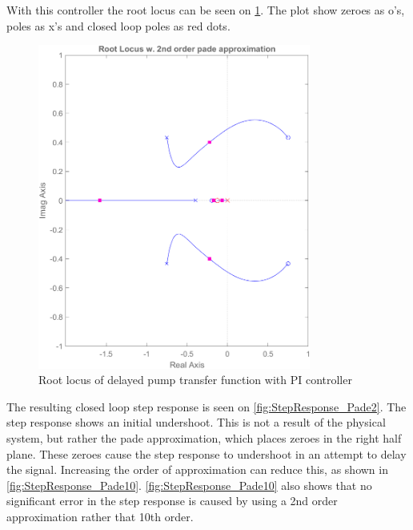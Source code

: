 With this controller the root locus can be seen on \cref{fig:RootLocus_PadeTwo}. The plot show zeroes as o's, poles as x's and closed loop poles as red dots.
\begin{figure}[h!]
	\centering
	\includegraphics[width=0.8\textwidth]{Pictures/RootLocus_Pade2.png}
	
	\caption{Root locus of delayed pump transfer function with PI controller}
	\label{fig:RootLocus_PadeTwo}
\end{figure}

The resulting closed loop step response is seen on \cref{fig:StepResponse_Pade2}. The step response shows an initial undershoot. This is not a result of the physical system, but rather the pade approximation, which places zeroes in the right half plane. These zeroes cause the step response to undershoot in an attempt to delay the signal. Increasing the order of approximation can reduce this, as shown in \cref{fig:StepResponse_Pade10}. \cref{fig:StepResponse_Pade10} also shows that no significant error in the step response is caused by using a 2nd order approximation rather that 10th order.

